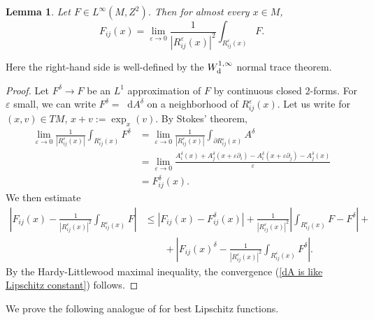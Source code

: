 \documentclass[reqno,11pt]{amsart}
\newcommand*\dif{\mathop{}\!\mathrm{d}}
\newtheorem{lemma}[theorem]{Lemma}
\theoremstyle{definition}
\numberwithin{equation}{section}
\begin{document}
\begin{lemma}
Let $F \in L^\infty(M, Z^2)$. Then for almost every $x \in M$,
\begin{equation}\label{dA is like Lipschitz constant}
	F_{ij}(x) = \lim_{\varepsilon \to 0} \frac{1}{|R^\varepsilon_{ij}(x)|^2} \int_{R^\varepsilon_{ij}(x)} F.
\end{equation}
\end{lemma}
Here the right-hand side is well-defined by the $W^{1, \infty}_{\rm d}$ normal trace theorem.
\begin{proof}
Let $F^\delta \to F$ be an $L^1$ approximation of $F$ by continuous closed $2$-forms.
For $\varepsilon$ small, we can write $F^\delta = \dif A^\delta$ on a neighborhood of $R^\varepsilon_{ij}(x)$.
Let us write for $(x, v) \in TM$, $x + v := \exp_x(v)$.
By Stokes' theorem,
\begin{align*}
\lim_{\varepsilon \to 0} \frac{1}{|R^\varepsilon_{ij}(x)|} \int_{R^\varepsilon_{ij}(x)} F^\delta
&= \lim_{\varepsilon \to 0} \frac{1}{|R^\varepsilon_{ij}(x)|} \int_{\partial R^\varepsilon_{ij}(x)} A^\delta \\
&= \lim_{\varepsilon \to 0} \frac{A_i^\delta(x) + A_j^\delta(x + \varepsilon \partial_i) - A_i^\delta(x + \varepsilon \partial_j) - A_j^\delta(x)}{\varepsilon} \\
&= F_{ij}^\delta(x).
\end{align*}
We then estimate 
\begin{align*}
\left|F_{ij}(x) - \frac{1}{|R^\varepsilon_{ij}(x)|^2} \int_{R^\varepsilon_{ij}(x)} F\right|
&\leq |F_{ij}(x) - F_{ij}^\delta(x)| + \frac{1}{|R^\varepsilon_{ij}(x)|^2} \left|\int_{R^\varepsilon_{ij}(x)} F - F^\delta\right| + \\
&\qquad +  \left|F_{ij}(x)^\delta - \frac{1}{|R^\varepsilon_{ij}(x)|^2} \int_{R^\varepsilon_{ij}(x)} F^\delta\right|.
\end{align*}
By the Hardy-Littlewood maximal inequality, the convergence (\ref{dA is like Lipschitz constant}) follows.
\end{proof}

We prove the following analogue of \cite[Lemma 4.2]{Crandall2008} for best Lipschitz functions.
\end{document}

